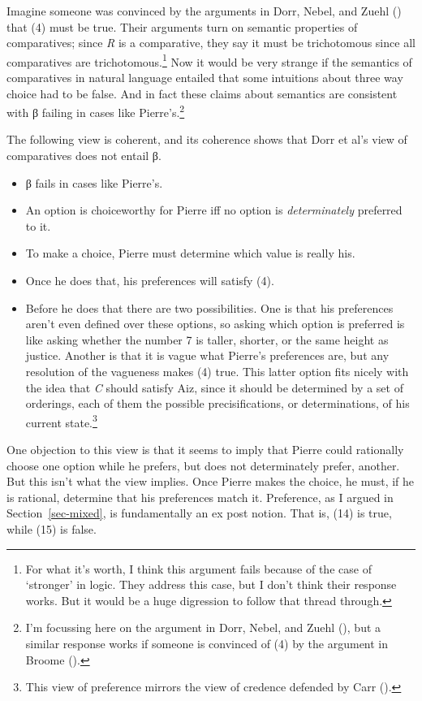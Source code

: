 \documentclass[
  11pt,
  letterpaper,
  DIV=11,
  numbers=noendperiod,
  twoside]{scrartcl}
\providecommand{\tightlist}{%
  \setlength{\itemsep}{0pt}\setlength{\parskip}{0pt}}
\begin{document}
Imagine someone was convinced by the arguments in Dorr, Nebel, and Zuehl
() that (4) must be true. Their
arguments turn on semantic properties of comparatives; since \emph{R} is
a comparative, they say it must be trichotomous since all comparatives
are trichotomous.\footnote{For what it's worth, I think this argument
  fails because of the case of `stronger' in logic. They address this
  case, but I don't think their response works. But it would be a huge
  digression to follow that thread through.} Now it would be very
strange if the semantics of comparatives in natural language entailed
that some intuitions about three way choice had to be false. And in fact
these claims about semantics are consistent with β failing in cases like
Pierre's.\footnote{I'm focussing here on the argument in Dorr, Nebel,
  and Zuehl (), but a similar response
  works if someone is convinced of (4) by the argument in Broome
  ().}

The following view is coherent, and its coherence shows that Dorr et
al's view of comparatives does not entail β.

\begin{itemize}
\tightlist
\item
  β fails in cases like Pierre's.
\item
  An option is choiceworthy for Pierre iff no option is
  \emph{determinately} preferred to it.
\item
  To make a choice, Pierre must determine which value is really his.
\item
  Once he does that, his preferences will satisfy (4).
\item
  Before he does that there are two possibilities. One is that his
  preferences aren't even defined over these options, so asking which
  option is preferred is like asking whether the number 7 is taller,
  shorter, or the same height as justice. Another is that it is vague
  what Pierre's preferences are, but any resolution of the vagueness
  makes (4) true. This latter option fits nicely with the idea that
  \emph{C} should satisfy Aiz, since it should be determined by a set of
  orderings, each of them the possible precisifications, or
  determinations, of his current state.\footnote{This view of preference
    mirrors the view of credence defended by Carr
    ().}
\end{itemize}

One objection to this view is that it seems to imply that Pierre could
rationally choose one option while he prefers, but does not
determinately prefer, another. But this isn't what the view implies.
Once Pierre makes the choice, he must, if he is rational, determine that
his preferences match it. Preference, as I argued in
Section~\ref{sec-mixed}, is fundamentally an ex post notion. That is,
(14) is true, while (15) is false.
\end{document}
